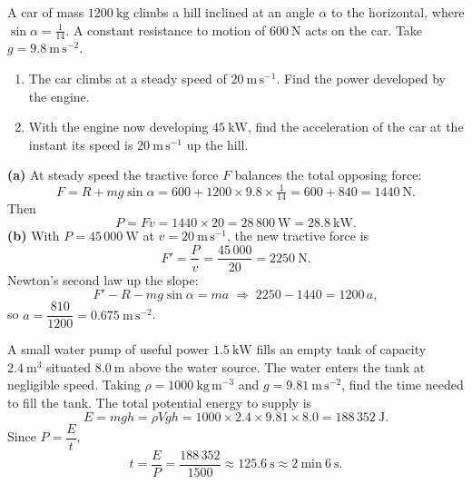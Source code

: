 \documentclass[11pt]{article}
\begin{document}
\begin{exoresolu}
A car of mass $1200\ \mathrm{kg}$ climbs a hill inclined at an angle $\alpha$ to the horizontal, where $\sin\alpha = \tfrac{1}{14}$. A constant resistance to motion of $600\ \mathrm{N}$ acts on the car. Take $g = 9.8\ \mathrm{m\,s^{-2}}$.
\begin{enumerate}
\item[(a)] The car climbs at a steady speed of $20\ \mathrm{m\,s^{-1}}$. Find the power developed by the engine.
\item[(b)] With the engine now developing $45\ \mathrm{kW}$, find the acceleration of the car at the instant its speed is $20\ \mathrm{m\,s^{-1}}$ up the hill.
\end{enumerate}
\tcblower
\textbf{(a)} At steady speed the tractive force $F$ balances the total opposing force:
\[
F = R + mg\sin\alpha = 600 + 1200 \times 9.8 \times \tfrac{1}{14} = 600 + 840 = 1440\ \mathrm{N}.
\]
Then
\[
P = Fv = 1440 \times 20 = 28\,800\ \mathrm{W} = 28.8\ \mathrm{kW}.
\]
\textbf{(b)} With $P = 45\,000\ \mathrm{W}$ at $v = 20\ \mathrm{m\,s^{-1}}$, the new tractive force is
\[
F' = \frac{P}{v} = \frac{45\,000}{20} = 2250\ \mathrm{N}.
\]
Newton's second law up the slope:
\[
F' - R - mg\sin\alpha = ma \;\Longrightarrow\; 2250 - 1440 = 1200\,a,
\]
so $a = \dfrac{810}{1200} = 0.675\ \mathrm{m\,s^{-2}}$.
\end{exoresolu}

\begin{exoresolu}
A small water pump of useful power $1.5\ \mathrm{kW}$ fills an empty tank of capacity $2.4\ \mathrm{m^{3}}$ situated $8.0\ \mathrm{m}$ above the water source. The water enters the tank at negligible speed. Taking $\rho = 1000\ \mathrm{kg\,m^{-3}}$ and $g = 9.81\ \mathrm{m\,s^{-2}}$, find the time needed to fill the tank.
\tcblower
The total potential energy to supply is
\[
E = mgh = \rho V g h = 1000 \times 2.4 \times 9.81 \times 8.0 = 188\,352\ \mathrm{J}.
\]
Since $P = \dfrac{E}{t}$,
\[
t = \frac{E}{P} = \frac{188\,352}{1500} \approx 125.6\ \mathrm{s} \approx 2\ \mathrm{min}\ 6\ \mathrm{s}.
\]
\end{exoresolu}
\end{document}
